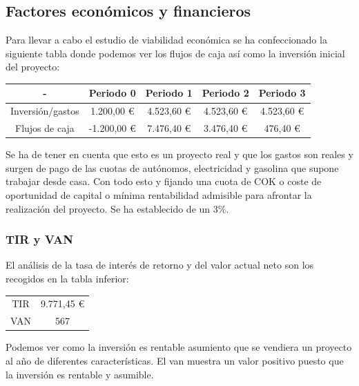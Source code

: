 \documentclass[a4paper ,12pt, onecolumn]{article}
\begin{document}
    \subsection{Factores económicos y financieros}
        Para llevar a cabo el estudio de viabilidad económica se ha confeccionado la siguiente tabla donde
        podemos ver los flujos de caja así como la inversión inicial del proyecto:
        \begin{center}
            \begin{tabular}{||c | c |c |c |c ||} 
            \hline
             - & Periodo 0 & Periodo 1& Periodo 2 & Periodo 3  \\ [0.5ex] 
            \hline
            \hline
                Inversión/gastos &1.200,00 € 	& 4.523,60 € 	& 4.523,60 € 	& 4.523,60 € \\ 
                Flujos de caja  &-1.200,00 € 	& 7.476,40 € 	& 3.476,40 € 	& 476,40 € \\ 
            \hline
            \end{tabular}
        \end{center}
        Se ha de tener en cuenta que esto es un proyecto real y que los gastos son reales y surgen de pago de
        las cuotas de autónomos, electricidad y gasolina que supone trabajar desde casa. Con todo esto y fijando una cuota
        de COK o coste de oportunidad de capital o mínima rentabilidad admisible para afrontar la realización del
        proyecto. Se ha establecido de un 3\%.
    \subsubsection{TIR y VAN}
        El análisis de la tasa de interés de retorno y del valor actual neto son los recogidos en la tabla inferior:
        \begin{center}
            \begin{tabular}{||c | c ||} 
            \hline
                TIR & 9.771,45 € \\ [0.5ex] 
                VAN & 567  \\ [0.5ex] 
            \hline
            \end{tabular}
        \end{center}
        Podemos ver como la inversión es rentable asumiento que se vendiera un proyecto al año de diferentes características.
        El van muestra un valor positivo puesto que la inversión es rentable y asumible.
\end{document}
